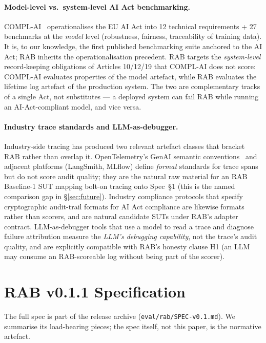 \documentclass[11pt,a4paper]{article}
\begin{document}
\paragraph{Model-level vs.\ system-level AI Act benchmarking.} COMPL-AI~\cite{guldimann2024complai} operationalises the EU AI Act into 12 technical requirements + 27 benchmarks at the \emph{model} level (robustness, fairness, traceability of training data). It is, to our knowledge, the first published benchmarking suite anchored to the AI Act; RAB inherits the operationalisation precedent. RAB targets the \emph{system-level} record-keeping obligations of Articles 10/12/19 that COMPL-AI does not score: COMPL-AI evaluates properties of the model artefact, while RAB evaluates the lifetime log artefact of the production system. The two are complementary tracks of a single Act, not substitutes --- a deployed system can fail RAB while running an AI-Act-compliant model, and vice versa.

\paragraph{Industry trace standards and LLM-as-debugger.} Industry-side tracing has produced two relevant artefact classes that bracket RAB rather than overlap it. OpenTelemetry's GenAI semantic conventions~\cite{otel2024genaisemconv} and adjacent platforms (LangSmith, MLflow) define \emph{format} standards for trace spans but do not score audit quality; they are the natural raw material for an RAB Baseline-1 SUT mapping bolt-on tracing onto Spec~§1 (this is the named comparison gap in §\ref{sec:future}). Industry compliance protocols that specify cryptographic audit-trail formats for AI Act compliance are likewise formats rather than scorers, and are natural candidate SUTs under RAB's adapter contract. LLM-as-debugger tools that use a model to read a trace and diagnose failure attribution measure the \emph{LLM's debugging capability}, not the trace's audit quality, and are explicitly compatible with RAB's honesty clause H1 (an LLM may consume an RAB-scoreable log without being part of the scorer).

\section{RAB v0.1.1 Specification}
\label{sec:spec}

The full spec is part of the release archive (\texttt{eval/rab/SPEC-v0.1.md}). We summarise its load-bearing pieces; the spec itself, not this paper, is the normative artefact.
\end{document}
